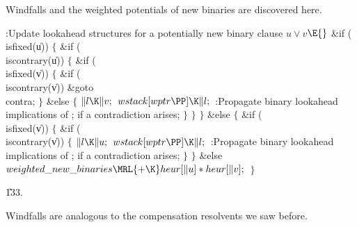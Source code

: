 Windfalls and the weighted potentials of new binaries are discovered
here.

\Y\B\4:Update lookahead structures for a potentially new binary clause $u%
\lor v$\X${}\E{}$\6
\&{if} (\\{isfixed}(\|u))\5
${}\{{}$\1\6
\&{if} (\\{iscontrary}(\|u))\5
${}\{{}$\1\6
\&{if} (\\{isfixed}(\|v))\5
${}\{{}$\1\6
\&{if} (\\{iscontrary}(\|v))\1\5
\&{goto} \\{contra};\2\6
\4${}\}{}$\5
\2\&{else}\5
${}\{{}$\1\6
${}\|l\K\|v;{}$\6
${}\\{wstack}[\\{wptr}\PP]\K\|l;{}$\6
:Propagate binary lookahead implications of ;  if a contradiction arises\X;\6
\4${}\}{}$\2\6
\4${}\}{}$\2\6
\4${}\}{}$\5
\2\&{else}\5
${}\{{}$\1\6
\&{if} (\\{isfixed}(\|v))\5
${}\{{}$\1\6
\&{if} (\\{iscontrary}(\|v))\5
${}\{{}$\1\6
${}\|l\K\|u;{}$\6
${}\\{wstack}[\\{wptr}\PP]\K\|l;{}$\6
:Propagate binary lookahead implications of ;  if a contradiction arises\X;\6
\4${}\}{}$\2\6
\4${}\}{}$\5
\2\&{else}\1\5
${}\\{weighted\_new\_binaries}\MRL{+{\K}}\\{heur}[\|u]*\\{heur}[\|v];{}$\2\6
\4${}\}{}$\2\par
\U133.\fi

Windfalls are analogous to the compensation resolvents we saw before.

